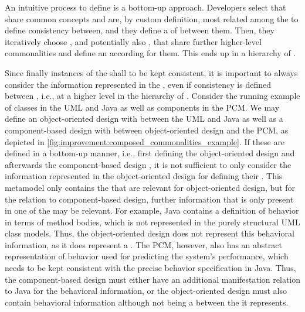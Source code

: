 An intuitive process to define \commonalities is a bottom-up approach.
Developers select \concretemetamodels that share common concepts and are, by custom definition, most related among the \concretemetamodels to define consistency between, and they define a \conceptmetamodel of \commonalities between them.
Then, they iteratively choose \conceptmetamodels, and potentially also \concretemetamodels, that share further higher-level commonalities and define an according \conceptmetamodel for them.
This ends up in a hierarchy of \conceptmetamodels.

Since finally instances of the \concretemetamodels shall to be kept consistent, it is important to always consider the information represented in the \concretemetamodels, even if consistency is defined between \conceptmetamodels, i.e., at a higher level in the hierarchy of \conceptmetamodels.
Consider the running example of classes in the \gls{UML} and Java as well as components in the \gls{PCM}.
We may define an object-oriented design \conceptmetamodel with \commonalities between the \gls{UML} and Java as well as a component-based design \conceptmetamodel with \commonalities between object-oriented design and the \gls{PCM}, as depicted in \autoref{fig:improvement:composed_commonalities_example}.
If these \conceptmetamodels are defined in a bottom-up manner, i.e., first defining the object-oriented design \conceptmetamodel and afterwards the component-based design \conceptmetamodels, it is not sufficient to only consider the information represented in the object-oriented design \conceptmetamodels for defining their \commonalities.
This metamodel only contains the \commonalities that are relevant for object-oriented design, but for the relation to component-based design, further information that is only present in one of the \concretemetamodels may be relevant.
For example, Java contains a definition of behavior in terms of method bodies, which is not represented in the purely structural \gls{UML} class models.
Thus, the object-oriented design \conceptmetamodel does not represent this behavioral information, as it does represent a \commonality.
The \gls{PCM}, however, also has an abstract representation of behavior used for predicting the system's performance, which needs to be kept consistent with the precise behavior specification in Java.
Thus, the component-based design \conceptmetamodel must either have an additional manifestation relation to Java for the behavioral information, or the object-oriented design \conceptmetamodel must also contain behavioral information although not being a \commonality between the \concretemetamodels it represents.

